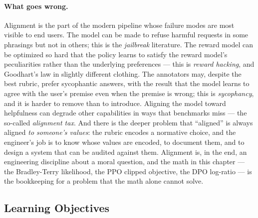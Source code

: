 \paragraph{What goes wrong.}
Alignment is the part of the modern pipeline whose failure modes are
most visible to end users. The model can be made to refuse harmful
requests in some phrasings but not in others; this is the
\emph{jailbreak} literature. The reward model can be optimized so
hard that the policy learns to satisfy the reward model's
peculiarities rather than the underlying preferences --- this is
\emph{reward hacking}, and Goodhart's law in slightly different
clothing. The annotators may, despite the best rubric, prefer
sycophantic answers, with the result that the model learns to
agree with the user's premise even when the premise is wrong; this
is \emph{sycophancy}, and it is harder to remove than to introduce.
Aligning the model toward helpfulness can degrade other capabilities
in ways that benchmarks miss --- the so-called \emph{alignment
tax}. And there is the deeper problem that ``aligned'' is always
aligned \emph{to someone's values}: the rubric encodes a normative
choice, and the engineer's job is to know whose values are encoded,
to document them, and to design a system that can be audited
against them. Alignment is, in the end, an engineering discipline
about a moral question, and the math in this chapter --- the
Bradley-Terry likelihood, the PPO clipped objective, the DPO
log-ratio --- is the bookkeeping for a problem that the math alone
cannot solve.

\subsection{Learning Objectives}

